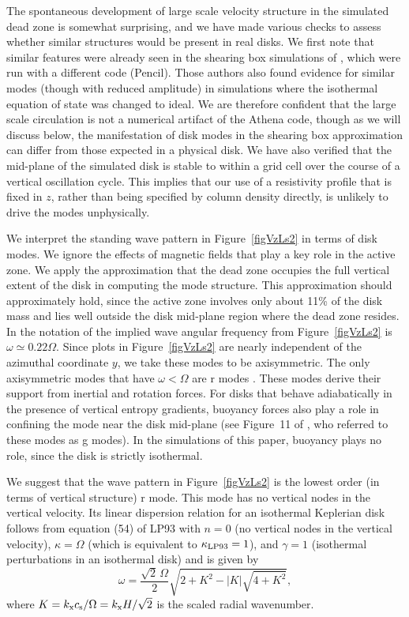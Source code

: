 The spontaneous development of large scale velocity structure in the simulated dead zone is somewhat surprising, and we have made various checks to assess whether similar structures would be present in real disks. We first note that similar features were already seen in the shearing box simulations of \cite{oishi09}, which were run with a different code (Pencil). Those authors also found evidence for similar modes (though with reduced amplitude) in simulations where the isothermal equation of state was changed to ideal. We are therefore confident that the large scale circulation is not a numerical artifact of the {\sc Athena} code, though as we will discuss below, the manifestation of disk modes in the shearing box approximation can differ from those expected in a physical disk. We have also verified that the mid-plane of the simulated disk is stable to within a grid cell over the course of a vertical oscillation cycle. This implies that our use of a resistivity profile that is fixed in $z$, rather than being specified by column density directly, is unlikely to drive the modes unphysically.

We interpret the  standing wave pattern in Figure~\ref{figVzLs2} in terms of disk modes.
We ignore the effects of magnetic fields that play a key role in the active zone.
We apply the approximation that the dead zone occupies the full vertical extent of the
disk in computing the mode structure.
This approximation should approximately hold, since
the active zone involves only about 11\% of the disk mass and lies well outside
the  disk mid-plane region where the dead zone resides.
In the notation of \cite{lubow93} the implied wave angular frequency from Figure~\ref{figVzLs2} is
 $\omega \simeq 0.22 \Omega$. Since plots in Figure~\ref{figVzLs2}  are nearly 
independent of the azimuthal coordinate $y$, we take these modes to be axisymmetric.
The only axisymmetric modes that have  $\omega <  \Omega$ are r modes \citep{lubow93,ogilvie98}. 
These modes derive their support from inertial and rotation forces. For disks that behave adiabatically in the presence of vertical entropy gradients, buoyancy
forces also play a role in confining the mode near the disk mid-plane (see Figure~11 of \cite{lubow93}, who referred to these modes as g modes).
In the simulations of this paper, buoyancy plays no role, since the disk is strictly isothermal.

We suggest that the wave pattern in Figure~\ref{figVzLs2} is the lowest order (in terms of vertical structure) r mode.  This mode has
no vertical nodes in the vertical velocity. Its linear dispersion relation for an isothermal Keplerian 
disk follows from equation (54) of LP93
with $n=0$ (no vertical nodes in the vertical velocity), $\kappa=\Omega$ (which is equivalent to $\kappa_{\rm LP93} = 1$), and $\gamma=1$ (isothermal perturbations in an isothermal disk) and is given by
\begin{equation}
\omega = \frac{\sqrt{2}\, \Omega}{2} \sqrt{ 2 + K^2 - |K| \sqrt{4 + K^2} },
\label{omega}
\end{equation}
where $K = k_{\rm x} c_{\rm s}/\Omega= k_{\rm x} H/\sqrt{2}$ is the scaled radial wavenumber.

